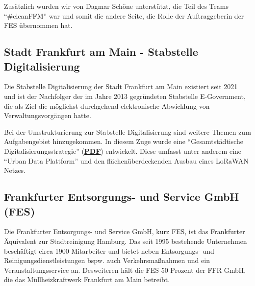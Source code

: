     Zusätzlich wurden wir von Dagmar Schöne unterstützt, die Teil des Teams \enquote{\#cleanFFM} war und somit die andere Seite, die Rolle der Auftraggeberin der FES übernommen hat.
    
    \subsection{Stadt Frankfurt am Main - Stabstelle Digitalisierung}

        Die Stabstelle Digitalisierung der Stadt Frankfurt am Main existiert seit 2021 und ist der Nachfolger der im Jahre 2013 gegründeten Stabstelle E-Government, die als Ziel die möglichst durchgehend elektronische Abwicklung von Verwaltungsvorgängen hatte.
        
        Bei der Umstrukturierung zur Stabstelle Digitalisierung sind weitere Themen zum Aufgabengebiet hinzugekommen.
        In diesem Zuge wurde eine \enquote{Gesamtstädtische Digitalisierungsstrategie} (\href{run:attachments/Frankfurt_Digitalisierungsstrategie.pdf}{\textbf{PDF}}) entwickelt.
        Diese umfasst unter anderem eine \enquote{Urban Data Plattform} und den flächenüberdeckenden Ausbau eines LoRaWAN Netzes.


    \subsection{Frankfurter Entsorgungs- und Service GmbH (FES)}

        Die Frankfurter Entsorgungs- und Service GmbH, kurz FES, ist das Frankfurter Äquivalent zur Stadtreinigung Hamburg. 
        Das seit 1995 bestehende Unternehmen beschäftigt circa 1900 Mitarbeiter und bietet neben Entsorgungs- und Reinigungsdienstleistungen bspw. auch Verkehrsmaßnahmen und ein Veranstaltungsservice an.
        Desweiteren hält die FES 50 Prozent der FFR GmbH, die das Müllheizkraftwerk Frankfurt am Main betreibt.

